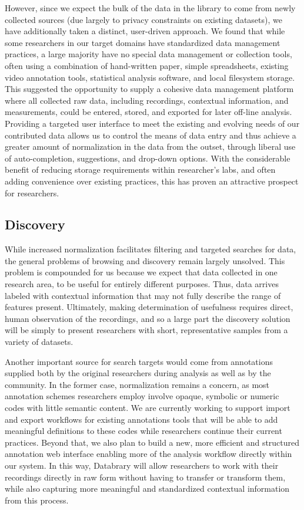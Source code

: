 \documentclass{sig-alternate}
\begin{document}
However, since we expect the bulk of the data in the library to come from newly collected sources (due largely to privacy constraints on existing datasets), we have additionally taken a distinct, user-driven approach.
We found that while some researchers in our target domains have standardized data management practices, a large majority have no special data management or collection tools, often using a combination of hand-written paper, simple spreadsheets, existing video annotation tools, statistical analysis software, and local filesystem storage.
This suggested the opportunity to supply a cohesive data management platform where all collected raw data, including recordings, contextual information, and measurements, could be entered, stored, and exported for later off-line analysis.
Providing a targeted user interface to meet the existing and evolving needs of our contributed data allows us to control the means of data entry and thus achieve a greater amount of normalization in the data from the outset, through liberal use of auto-completion, suggestions, and drop-down options.
With the considerable benefit of reducing storage requirements within researcher's labs, and often adding convenience over existing practices, this has proven an attractive prospect for researchers.

\subsection{Discovery}

While increased normalization facilitates filtering and targeted searches for data, the general problems of browsing and discovery remain largely unsolved.
This problem is compounded for us because we expect that data collected in one research area, to be useful for entirely different purposes.
Thus, data arrives labeled with contextual information that may not fully describe the range of features present.
Ultimately, making determination of usefulness requires direct, human observation of the recordings, and so a large part the discovery solution will be simply to present researchers with short, representative samples from a variety of datasets.

Another important source for search targets would come from annotations supplied both by the original researchers during analysis as well as by the community.
In the former case, normalization remains a concern, as most annotation schemes researchers employ involve opaque, symbolic or numeric codes with little semantic content.
We are currently working to support import and export workflows for existing annotations tools that will be able to add meaningful definitions to these codes while researchers continue their current practices.
Beyond that, we also plan to build a new, more efficient and structured annotation web interface enabling more of the analysis workflow directly within our system.
In this way, Databrary will allow researchers to work with their recordings directly in raw form without having to transfer or transform them, while also capturing more meaningful and standardized contextual information from this process.
\end{document}
